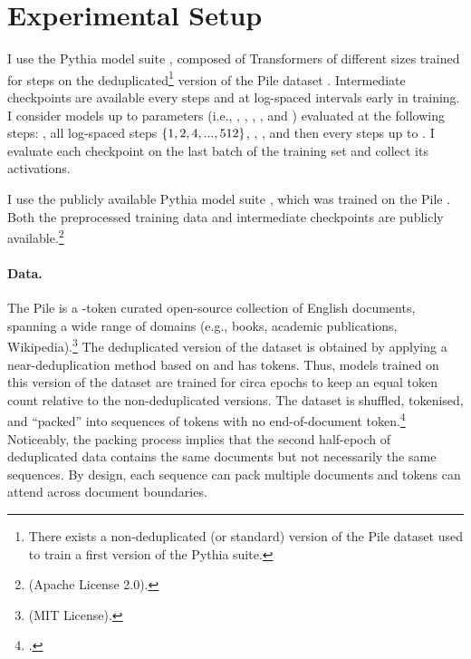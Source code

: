 \section{Experimental Setup}\label{sec:experimental_setup}

I use the Pythia model suite \citep{biderman2023pythia}, composed of  Transformers of different sizes trained for  steps on the deduplicated\footnote{There exists a non-deduplicated (or standard) version of the Pile dataset used to train a first version of the Pythia suite.} version of the Pile dataset \citep{gao2020pile}.
Intermediate checkpoints are available every  steps and at log-spaced intervals early in training. I consider models up to  parameters (i.e., \sevenmil, \sixmil, \fourmil, \onebil, and \twobil) evaluated at the following steps: , all log-spaced steps $\{1, 2, 4, ..., 512\}$, , , and then every  steps up to .
I evaluate each checkpoint on the last batch of the training set and collect its activations.

I use the publicly available Pythia model suite \citep{biderman2023pythia}, which was trained on the Pile \citep{gao2020pile}. Both the preprocessed training data and intermediate checkpoints are publicly available.\footnote{\href{https://github.com/EleutherAI/pythia}{} (Apache License 2.0).} 

\paragraph{Data.}
The Pile is a -token curated open-source collection of English documents, spanning a wide range of domains (e.g., books, academic publications, Wikipedia).\footnote{\href{https://github.com/EleutherAI/the-pile}{} (MIT License).}  
The deduplicated version of the dataset is obtained by applying a near-deduplication method based on  and has  tokens.
Thus, models trained on this version of the dataset are trained for circa  epochs to keep an equal token count relative to the non-deduplicated versions.
The dataset is shuffled, tokenised, and \enquote{packed} into sequences of  tokens with no end-of-document token.\footnote{\href{https://github.com/EleutherAI/pythia/issues/123}{}.}
Noticeably, the packing process implies that the second half-epoch of deduplicated data contains the same documents but not necessarily the same sequences. 
By design, each sequence can pack multiple documents and tokens can attend across document boundaries.

